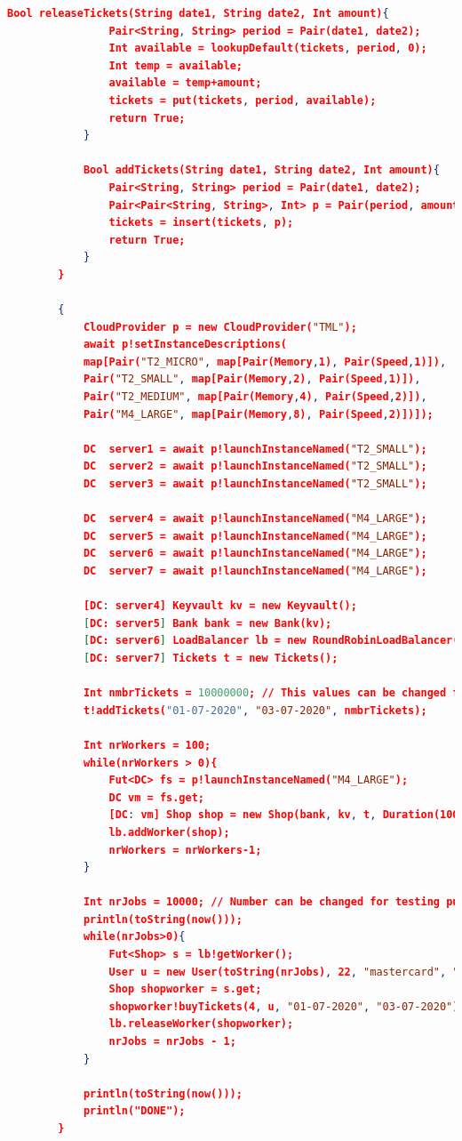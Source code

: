 \documentclass[10pt,a4paper,twocolumn]{article}
\begin{document}
\begin{appendices}
\begin{lstlisting}[language=json]
			Bool releaseTickets(String date1, String date2, Int amount){
				Pair<String, String> period = Pair(date1, date2);
				Int available = lookupDefault(tickets, period, 0);
				Int temp = available;
				available = temp+amount;
				tickets = put(tickets, period, available);
				return True;
			}
			
			Bool addTickets(String date1, String date2, Int amount){
				Pair<String, String> period = Pair(date1, date2);
				Pair<Pair<String, String>, Int> p = Pair(period, amount);
				tickets = insert(tickets, p);
				return True;
			}
		}
		
		{
			CloudProvider p = new CloudProvider("TML");
			await p!setInstanceDescriptions(
			map[Pair("T2_MICRO", map[Pair(Memory,1), Pair(Speed,1)]),
			Pair("T2_SMALL", map[Pair(Memory,2), Pair(Speed,1)]),
			Pair("T2_MEDIUM", map[Pair(Memory,4), Pair(Speed,2)]),
			Pair("M4_LARGE", map[Pair(Memory,8), Pair(Speed,2)])]);
			
			DC  server1 = await p!launchInstanceNamed("T2_SMALL");
			DC  server2 = await p!launchInstanceNamed("T2_SMALL");
			DC  server3 = await p!launchInstanceNamed("T2_SMALL");
			
			DC  server4 = await p!launchInstanceNamed("M4_LARGE");
			DC  server5 = await p!launchInstanceNamed("M4_LARGE");
			DC  server6 = await p!launchInstanceNamed("M4_LARGE");
			DC  server7 = await p!launchInstanceNamed("M4_LARGE");
			
			[DC: server4] Keyvault kv = new Keyvault();
			[DC: server5] Bank bank = new Bank(kv);
			[DC: server6] LoadBalancer lb = new RoundRobinLoadBalancer();
			[DC: server7] Tickets t = new Tickets();
			
			Int nmbrTickets = 10000000;	// This values can be changed for testing purposes
			t!addTickets("01-07-2020", "03-07-2020", nmbrTickets);
			
			Int nrWorkers = 100;
			while(nrWorkers > 0){
				Fut<DC> fs = p!launchInstanceNamed("M4_LARGE"); 
				DC vm = fs.get;
				[DC: vm] Shop shop = new Shop(bank, kv, t, Duration(1000));
				lb.addWorker(shop); 
				nrWorkers = nrWorkers-1;
			}
			
			Int nrJobs = 10000;	// Number can be changed for testing purposes
			println(toString(now()));
			while(nrJobs>0){
				Fut<Shop> s = lb!getWorker();
				User u = new User(toString(nrJobs), 22, "mastercard", "email", kv);
				Shop shopworker = s.get;
				shopworker!buyTickets(4, u, "01-07-2020", "03-07-2020");
				lb.releaseWorker(shopworker);
				nrJobs = nrJobs - 1;
			} 
			
			println(toString(now())); 
			println("DONE");
		}
	\end{lstlisting}
	
\end{appendices}
\end{document}
